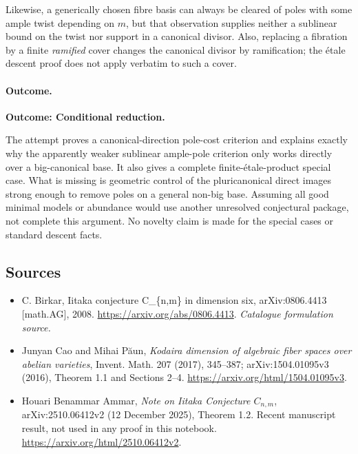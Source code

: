 \documentclass[11pt,a4paper]{article}
\numberwithin{equation}{section}
\begin{document}
Likewise, a generically chosen fibre basis can always be cleared of poles
with some ample twist depending on $m$, but that observation supplies
neither a sublinear bound on the twist nor support in a canonical divisor.
Also, replacing a fibration by a finite \emph{ramified} cover changes the
canonical divisor by ramification; the \'etale descent proof does not
apply verbatim to such a cover.

\paragraph{Outcome.}
\textbf{Outcome: Conditional reduction.}

The attempt proves a canonical-direction pole-cost criterion and explains
exactly why the apparently weaker sublinear ample-pole criterion only
works directly over a big-canonical base. It also gives a complete
finite-\'etale-product special case. What is missing is geometric control
of the pluricanonical direct images strong enough to remove poles on a
general non-big base. Assuming all good minimal models or abundance would
use another unresolved conjectural package, not complete this argument.
No novelty claim is made for the special cases or standard descent facts.

\subsection{Sources}
\begin{itemize}\raggedright
\item[\textnormal{[S1]}]\hypertarget{source:30005168:1}{} C. Birkar, Iitaka conjecture C\_\{n,m\} in dimension six, arXiv:0806.4413 [math.AG], 2008.
\url{https://arxiv.org/abs/0806.4413}.
{\small\textit{Catalogue formulation source.}}
\item[\textnormal{[E1]}]\hypertarget{extra:30005168:1}{} Junyan Cao and Mihai P\u{a}un,
\emph{Kodaira dimension of algebraic fiber spaces over abelian varieties},
Invent. Math. 207 (2017), 345--387; arXiv:1504.01095v3 (2016),
Theorem 1.1 and Sections 2--4.
\url{https://arxiv.org/html/1504.01095v3}.
\item[\textnormal{[E2]}]\hypertarget{extra:30005168:2}{} Houari Benammar Ammar,
\emph{Note on Iitaka Conjecture $C_{n,m}$}, arXiv:2510.06412v2
(12 December 2025), Theorem 1.2. Recent manuscript result, not used in
any proof in this notebook.
\url{https://arxiv.org/html/2510.06412v2}.
\end{itemize}
\end{document}
